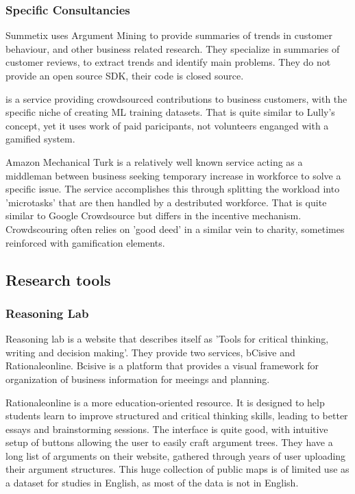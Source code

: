 \documentclass{report}
\begin{document}
\subsubsection{Specific Consultancies}
Summetix \cite{schiller_stance_2021} uses Argument Mining to provide summaries of trends in customer behaviour, and other business related research. They specialize in summaries of customer reviews, to extract trends and identify main problems. They do not provide an open source SDK, their code is closed source.

\cite{noauthor_crowdee_nodate} is a service providing crowdsourced contributions to business customers, with the specific niche of creating ML training datasets. That is quite similar to Lully's concept, yet it uses work of paid paricipants, not volunteers enganged with a gamified system.

Amazon Mechanical Turk \cite{noauthor_amazon_nodate} is a relatively well known service acting as a middleman between business seeking temporary increase in workforce to solve a specific issue.
The service accomplishes this through splitting the workload into 'microtasks' that are then handled by a destributed workforce. That is quite similar to Google Crowdsource but differs in the incentive mechanism. Crowdscouring often relies on 'good deed' in a similar vein to charity, sometimes reinforced with gamification elements.

\subsection{Research tools}
\subsubsection{Reasoning Lab}
Reasoning lab \cite{noauthor_argument_nodate} is a website that describes itself as 'Tools for critical thinking, writing and decision making'. They provide two services, bCisive and Rationaleonline.
Bcisive \cite{noauthor_bcisive_nodate} is a platform that provides a visual framework for organization of business information for meeings and planning.

Rationaleonline \cite{noauthor_rationale_nodate} is a more education-oriented resource. It is designed to help students learn to improve structured and critical thinking skills, leading to better essays and brainstorming sessions.
The interface is quite good, with intuitive setup of buttons allowing the user to easily craft argument trees.
They have a long list of arguments on their website, gathered through years of user uploading their argument structures.
This huge collection of public maps is of limited use as a dataset for studies in English, as most of the data is not in English.
\end{document}
